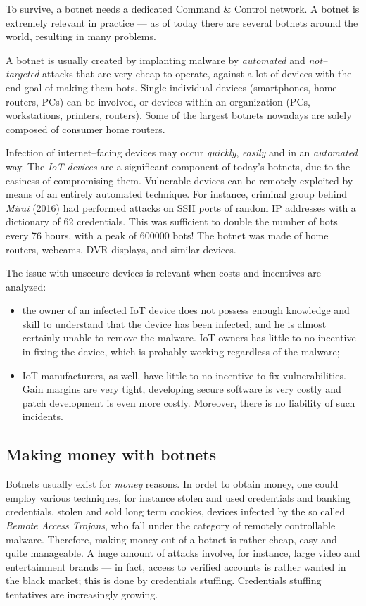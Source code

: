 \documentclass[10pt]{\classname}
\begin{document}
To survive, a botnet needs a dedicated Command \& Control network. A botnet is
extremely relevant in practice --- as of today there are several botnets around
the world, resulting in many problems.

A botnet is usually created by implanting malware by \emph{automated} and
\emph{not--targe\-ted} attacks that are very cheap to operate, against a lot of
devices with the end goal of making them bots. Single individual devices
(smartphones, home routers, PCs) can be involved, or devices within an
organization (PCs, workstations, printers, routers). Some of the largest
botnets nowadays are solely composed of consumer home routers.

Infection of internet--facing devices may occur \emph{quickly}, \emph{easily}
and in an \emph{automated} way. The \emph{IoT devices} are a significant
component of today's botnets, due to the easiness of compromising them.
Vulnerable devices can be remotely exploited by means of an entirely automated
technique. For instance, criminal group behind \emph{Mirai} (2016) had
performed attacks on SSH ports of random IP addresses with a dictionary of 62
credentials. This was sufficient to double the number of bots every 76 hours,
with a peak of 600000 bots! The botnet was made of home routers, webcams, DVR
displays, and similar devices.

The issue with unsecure devices is relevant when costs and incentives are
analyzed:
\begin{itemize}
    \item the owner of an infected IoT device does not possess enough knowledge
        and skill to understand that the device has been infected, and he is
        almost certainly unable to remove the malware. IoT owners has little to
        no incentive in fixing the device, which is probably working regardless
        of the malware;
    \item IoT manufacturers, as well, have little to no incentive to fix
        vulnerabilities. Gain margins are very tight, developing secure
        software is very costly and patch development is even more costly.
        Moreover, there is no liability of such incidents.
\end{itemize}


\subsection{Making money with botnets}

Botnets usually exist for \emph{money} reasons. In ordet to obtain money, one
could employ various techniques, for instance stolen and used credentials and
banking credentials, stolen and sold long term cookies, devices infected by the
so called \emph{Remote Access Trojans}, who fall under the category of
remotely controllable malware. Therefore, making money out of a botnet is
rather cheap, easy and quite manageable. A huge amount of attacks involve, for
instance, large video and entertainment brands --- in fact, access to verified
accounts is rather wanted in the black market; this is done by credentials
stuffing. Credentials stuffing tentatives are increasingly growing.
\end{document}
